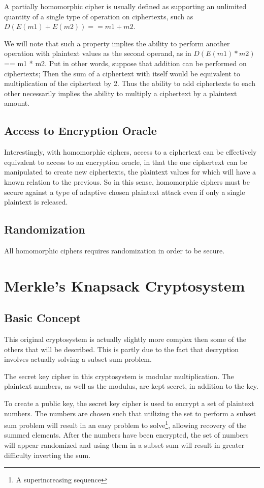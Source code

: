 \documentclass[preprint]{iacrtrans}
\begin{document}
A partially homomorphic cipher is usually defined as supporting an unlimited quantity of a single type of operation on ciphertexts, such as $D(E(m1) + E(m2)) == m1 + m2$.

We will note that such a property implies the ability to perform another operation with plaintext values as the second operand, as in $D(E(m1) * m2)$ == m1 * m2. Put in other words, suppose that addition can be performed on ciphertexts; Then the sum of a ciphertext with itself would be equivalent to multiplication of the ciphertext by 2. Thus the ability to add ciphertexts to each other necessarily implies the ability to multiply a ciphertext by a plaintext amount.

\subsection{Access to Encryption Oracle}
Interestingly, with homomorphic ciphers, access to a ciphertext can be effectively equivalent to access to an encryption oracle, in that the one ciphertext can be manipulated to create new ciphertexts, the plaintext values for which will have a known relation to the previous. So in this sense, homomorphic ciphers must be secure against a type of adaptive chosen plaintext attack even if only a single plaintext is released.

\subsection{Randomization}
All homomorphic ciphers requires randomization in order to be secure. 

\section{Merkle's Knapsack Cryptosystem}
\subsection{Basic Concept}
This original cryptosystem is actually slightly more complex then some of the others that will be described. This is partly due to the fact that decryption involves actually solving a subset sum problem.

The secret key cipher in this cryptosystem is modular multiplication. The plaintext numbers, as well as the modulus, are kept secret, in addition to the key.

To create a public key, the secret key cipher is used to encrypt a set of plaintext numbers. The numbers are chosen such that utilizing the set to perform a subset sum problem will result in an easy problem to solve\footnote{\label{superincreasing sequence}A superincreasing sequence}, allowing recovery of the summed elements. After the numbers have been encrypted, the set of numbers will appear randomized and using them in a subset sum will result in greater difficulty inverting the sum.
\end{document}
